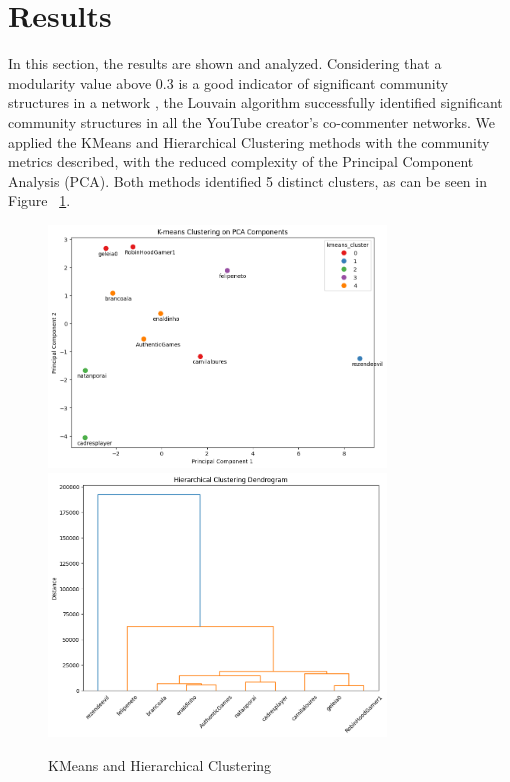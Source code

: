 \documentclass[12pt]{article}
\begin{document}
\section{Results}

In this section, the results are shown and analyzed. 
Considering that a modularity value above 0.3 is a good indicator of significant
community structures in a network \cite{PhysRevE.70.066111}, the Louvain algorithm successfully 
identified significant community structures in all the YouTube creator's co-commenter networks.
We applied the KMeans and Hierarchical Clustering methods with the community metrics described, 
with the reduced complexity of the Principal Component Analysis (PCA). 
Both methods identified 5 distinct clusters, as can be seen in Figure ~\ref{fig:kmeans_hierarchical}.

\begin{figure}[hbt!]
    \centering
    \includegraphics[width=0.8\textwidth]{./imgs/KMeans_PCA.png}
    \vspace{0.5cm} %
    \includegraphics[width=0.8\textwidth]{./imgs/Hierarchical_clustering.png}
    \caption{KMeans and Hierarchical Clustering}
    \label{fig:kmeans_hierarchical}
\end{figure}
\end{document}
